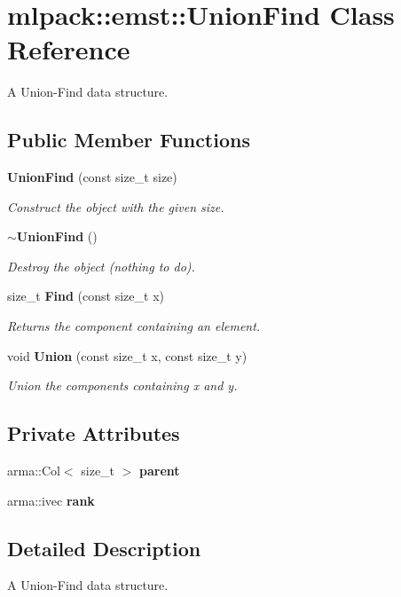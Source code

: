 \section{mlpack\-:\-:emst\-:\-:Union\-Find Class Reference}
\label{classmlpack_1_1emst_1_1UnionFind}


A Union-\/\-Find data structure.  


\subsection*{Public Member Functions}
\begin{DoxyCompactItemize}
\item 
{\bf Union\-Find} (const size\-\_\-t size)
\begin{DoxyCompactList}\small\item\em Construct the object with the given size. \end{DoxyCompactList}\item 
{\bf $\sim$\-Union\-Find} ()
\begin{DoxyCompactList}\small\item\em Destroy the object (nothing to do). \end{DoxyCompactList}\item 
size\-\_\-t {\bf Find} (const size\-\_\-t x)
\begin{DoxyCompactList}\small\item\em Returns the component containing an element. \end{DoxyCompactList}\item 
void {\bf Union} (const size\-\_\-t x, const size\-\_\-t y)
\begin{DoxyCompactList}\small\item\em Union the components containing x and y. \end{DoxyCompactList}\end{DoxyCompactItemize}
\subsection*{Private Attributes}
\begin{DoxyCompactItemize}
\item 
arma\-::\-Col$<$ size\-\_\-t $>$ {\bf parent}
\item 
arma\-::ivec {\bf rank}
\end{DoxyCompactItemize}


\subsection{Detailed Description}
A Union-\/\-Find data structure. 

